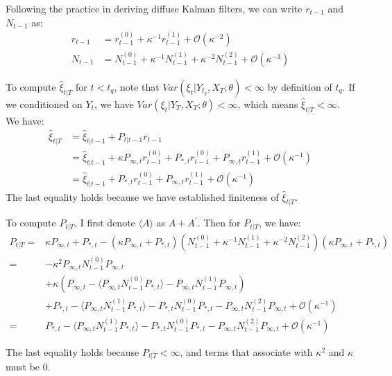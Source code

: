 \documentclass[10pt]{article}
\numberwithin{equation}{section}
\begin{document}
Following the practice in deriving diffuse Kalman filters, we can write $r_{t-1}$ and $N_{t-1}$ as: 
\begin{align*}
    r_{t-1} &= r_{t-1}^{(0)} + \kappa^{-1}r_{t-1}^{(1)} + \mathcal{O}(\kappa^{-2}) \\
    N_{t-1} &= N_{t-1}^{(0)} + \kappa^{-1}N_{t-1}^{(1)} + \kappa^{-2}N_{t-1}^{(2)} + \mathcal{O}(\kappa^{-3})
\end{align*}

To compute $\hat{\xi}_{t|T}$ for $t<t_q$, note that $Var(\xi_t|Y_{t_q},X_T;\theta)<\infty$ by definition of $t_q$. If we conditioned on $Y_t$, we have $Var(\xi_t|Y_T,X_T;\theta)<\infty$, which means $\hat{\xi}_{t|T}<\infty$. We have:
\begin{align*}
    \hat{\xi}_{t|T} &= \hat{\xi}_{t|t-1} + P_{t|t-1}r_{t-1} \\
    &= \hat{\xi}_{t|t-1} + \kappa P_{\infty,t}r_{t-1}^{(0)}+P_{*,t}r_{t-1}^{(0)}+P_{\infty,t}r_{t-1}^{(1)}+\mathcal{O}(\kappa^{-1}) \\
    &= \hat{\xi}_{t|t-1} + P_{*,t}r_{t-1}^{(0)}+P_{\infty,t}r_{t-1}^{(1)}+\mathcal{O}(\kappa^{-1})
\end{align*}
The last equality holds because we have established finiteness of $\hat{\xi}_{t|T}$. 

To compute $P_{t|T}$, I first denote $\langle A\rangle$ as $A+A^{'}$. Then for $P_{t|T}$, we have:
\begin{align*}
    P_{t|T} =& \kappa P_{\infty,t} + P_{*,t} - (\kappa P_{\infty,t} + P_{*,t})(N_{t-1}^{(0)}+\kappa^{-1}N_{t-1}^{(1)}+ \kappa^{-2}N_{t-1}^{(2)})(\kappa P_{\infty,t} + P_{*,t}) \\
    =& -\kappa^2P_{\infty,t}N_{t-1}^{(0)}P_{\infty,t} \\
    &+ \kappa (P_{\infty,t} - \langle P_{\infty,t}N_{t-1}^{(0)}P_{*,t}\rangle - P_{\infty,t}N_{t-1}^{(1)}P_{\infty,t}) \\
    &+ P_{*,t} - \langle P_{\infty,t}N_{t-1}^{(1)}P_{*,t}\rangle - P_{*,t}N_{t-1}^{(0)}P_{*,t} 
        - P_{\infty,t}N_{t-1}^{(2)}P_{\infty,t} + \mathcal{O}(\kappa^{-1}) \\
    =& P_{*,t} - \langle P_{\infty,t}N_{t-1}^{(1)}P_{*,t}\rangle - P_{*,t}N_{t-1}^{(0)}P_{*,t} 
        - P_{\infty,t}N_{t-1}^{(2)}P_{\infty,t} + \mathcal{O}(\kappa^{-1}) 
\end{align*}

The last equality holds because  $P_{t|T}<\infty$, and terms that associate with $\kappa^{2}$ and $\kappa$ must be $0$.
\end{document}
